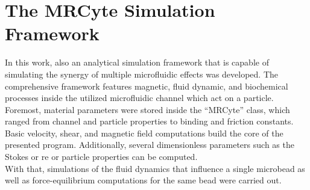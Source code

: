 \begin{figure}[h!]
	\centering
	 \hfill
	\addtocounter{subfigure}{-1}
	\label{fig:sim:CorrDiff}
\end{figure}
\clearpage

\section{The MRCyte Simulation Framework}
In this work, also an analytical simulation framework that is capable of simulating the synergy of multiple microfluidic effects was developed. The comprehensive framework features magnetic, fluid dynamic, and biochemical processes inside the utilized microfluidic channel which act on a particle. Foremost, material parameters were stored inside the ``MRCyte'' class, which ranged from channel and particle properties to binding and friction constants. Basic velocity, shear, and magnetic field computations build the core of the presented program. Additionally, several dimensionless parameters such as the Stokes or \gls{re} or particle properties can be computed.\\
With that, simulations of the fluid dynamics that influence a single microbead as well as force-equilibrium computations for the same bead were carried out. 

